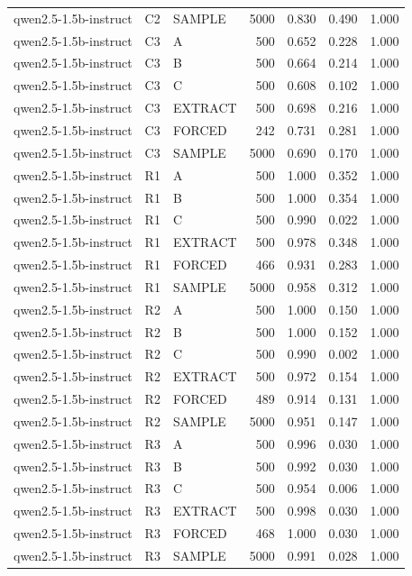 \begin{table}
\begin{tabular}{lllrrrr}
qwen2.5-1.5b-instruct & C2 & SAMPLE & 5000 & 0.830 & 0.490 & 1.000 \\
qwen2.5-1.5b-instruct & C3 & A & 500 & 0.652 & 0.228 & 1.000 \\
qwen2.5-1.5b-instruct & C3 & B & 500 & 0.664 & 0.214 & 1.000 \\
qwen2.5-1.5b-instruct & C3 & C & 500 & 0.608 & 0.102 & 1.000 \\
qwen2.5-1.5b-instruct & C3 & EXTRACT & 500 & 0.698 & 0.216 & 1.000 \\
qwen2.5-1.5b-instruct & C3 & FORCED & 242 & 0.731 & 0.281 & 1.000 \\
qwen2.5-1.5b-instruct & C3 & SAMPLE & 5000 & 0.690 & 0.170 & 1.000 \\
qwen2.5-1.5b-instruct & R1 & A & 500 & 1.000 & 0.352 & 1.000 \\
qwen2.5-1.5b-instruct & R1 & B & 500 & 1.000 & 0.354 & 1.000 \\
qwen2.5-1.5b-instruct & R1 & C & 500 & 0.990 & 0.022 & 1.000 \\
qwen2.5-1.5b-instruct & R1 & EXTRACT & 500 & 0.978 & 0.348 & 1.000 \\
qwen2.5-1.5b-instruct & R1 & FORCED & 466 & 0.931 & 0.283 & 1.000 \\
qwen2.5-1.5b-instruct & R1 & SAMPLE & 5000 & 0.958 & 0.312 & 1.000 \\
qwen2.5-1.5b-instruct & R2 & A & 500 & 1.000 & 0.150 & 1.000 \\
qwen2.5-1.5b-instruct & R2 & B & 500 & 1.000 & 0.152 & 1.000 \\
qwen2.5-1.5b-instruct & R2 & C & 500 & 0.990 & 0.002 & 1.000 \\
qwen2.5-1.5b-instruct & R2 & EXTRACT & 500 & 0.972 & 0.154 & 1.000 \\
qwen2.5-1.5b-instruct & R2 & FORCED & 489 & 0.914 & 0.131 & 1.000 \\
qwen2.5-1.5b-instruct & R2 & SAMPLE & 5000 & 0.951 & 0.147 & 1.000 \\
qwen2.5-1.5b-instruct & R3 & A & 500 & 0.996 & 0.030 & 1.000 \\
qwen2.5-1.5b-instruct & R3 & B & 500 & 0.992 & 0.030 & 1.000 \\
qwen2.5-1.5b-instruct & R3 & C & 500 & 0.954 & 0.006 & 1.000 \\
qwen2.5-1.5b-instruct & R3 & EXTRACT & 500 & 0.998 & 0.030 & 1.000 \\
qwen2.5-1.5b-instruct & R3 & FORCED & 468 & 1.000 & 0.030 & 1.000 \\
qwen2.5-1.5b-instruct & R3 & SAMPLE & 5000 & 0.991 & 0.028 & 1.000 \\

\end{tabular}
\end{table}
